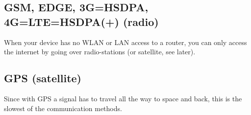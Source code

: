 \subsection{GSM, EDGE, 3G=HSDPA, 4G=LTE=HSDPA(+) (radio)}
When your device has no WLAN or LAN access to a router, you can only access the internet by going over radio-stations (or satellite, see later). 


\subsection{GPS (satellite)}
Since with GPS a signal has to travel all the way to space and back, this is the slowest of the communication methods. 
